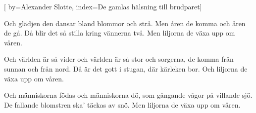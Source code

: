 


[ 	%
	by={Alexander Slotte},	%
	index={De gamlas hälsning till brudparet}]		%
	
\beginverse*		%
Och glädjen den dansar bland blommor och strå.
Men åren de komma och åren de gå.
Då blir det så stilla kring vännerna två.
Men liljorna de växa upp om våren.
\endverse			%

\beginverse*		%
Och världen är så vider och världen är så stor
och sorgerna, de komma från sunnan och från nord.
Då är det gott i stugan, där kärleken bor.
Och liljorna de växa upp om våren.
\endverse			%

\beginverse*		%
Och människorna födas och människorna dö,
som gångande vågor på villande sjö.
De fallande blomstren ska' täckas av snö.
Men liljorna de växa upp om våren.
\endverse			%
\endsong			%
